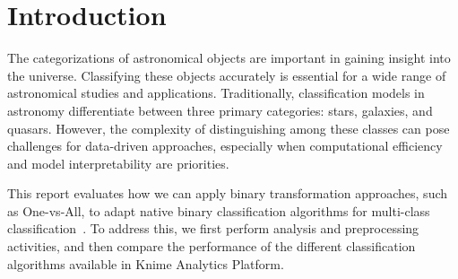 
\tableofcontents
\section{Introduction}
The categorizations of astronomical objects are important in gaining insight into the universe. Classifying these objects accurately is essential for a wide range of astronomical studies and applications. Traditionally, classification models in astronomy differentiate between three primary categories: stars, galaxies, and quasars. However, the complexity of distinguishing among these classes can pose challenges for data-driven approaches, especially when computational efficiency and model interpretability are priorities.

This report evaluates how we can apply binary transformation approaches, such as One-vs-All, to adapt native binary classification algorithms for multi-class classification~\cite{multiclassalgo}.
To address this, we first perform analysis and preprocessing activities, and then compare the performance of the different classification algorithms available in Knime Analytics Platform.